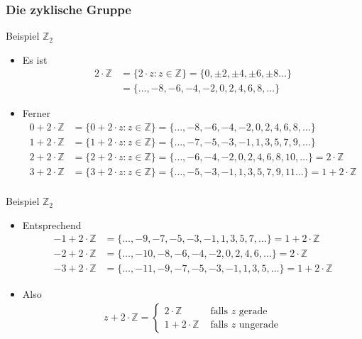 \documentclass{beamer}
\newcommand\ZZ{\mathbb Z}
\begin{document}
\begin{frame}\frametitle{Die zyklische Gruppe}
	\begin{overprint}
		\begin{block}{Beispiel $\ZZ_2$}
			\begin{itemize}
				\item Es ist
					\begin{align*}
						2\cdot\ZZ&=\{2\cdot z:z\in\ZZ\}=\{0,\pm2,\pm4,\pm6,\pm8\ldots\}\\
								 &=\{\ldots,-8,-6,-4,-2,0,2,4,6,8,\ldots\}
					\end{align*}
				\item Ferner
					\begin{align*}
						0+2\cdot\ZZ&=\{0+2\cdot z:z\in\ZZ\}=\{\ldots,-8,-6,-4,-2,0,2,4,6,8,\ldots\}\\
						1+2\cdot\ZZ&=\{1+2\cdot z:z\in\ZZ\}=\{\ldots,-7,-5,-3,-1,1,3,5,7,9,\ldots\}\\
						2+2\cdot\ZZ&=\{2+2\cdot z:z\in\ZZ\}=\{\ldots,-6,-4,-2,0,2,4,6,8,10,\ldots\}=2\cdot\ZZ\\
						3+2\cdot\ZZ&=\{3+2\cdot z:z\in\ZZ\}=\{\ldots,-5,-3,-1,1,3,5,7,9,11\ldots\}=1+2\cdot\ZZ\\
					\end{align*}
			\end{itemize}
		\end{block}
		\begin{block}{Beispiel $\ZZ_2$}
			\begin{itemize}
				\item Entsprechend
					\begin{align*}
						-1+2\cdot\ZZ&=\{\ldots,-9,-7,-5,-3,-1,1,3,5,7,\ldots\}=1+2\cdot\ZZ\\
						-2+2\cdot\ZZ&=\{\ldots,-10,-8,-6,-4,-2,0,2,4,6,\ldots\}=2\cdot\ZZ\\
						-3+2\cdot\ZZ&=\{\ldots,-11,-9,-7,-5,-3,-1,1,3,5,\ldots\}=1+2\cdot\ZZ
					\end{align*}
				\item Also
					\begin{align*}
						z+2\cdot\ZZ=\begin{cases}
							2\cdot\ZZ&\mbox{ falls $z$ gerade}\\
							1+2\cdot\ZZ&\mbox{ falls $z$ ungerade}
						\end{cases}
					\end{align*}
			\end{itemize}
		\end{block}

\end{overprint}
\end{frame}
\end{document}
